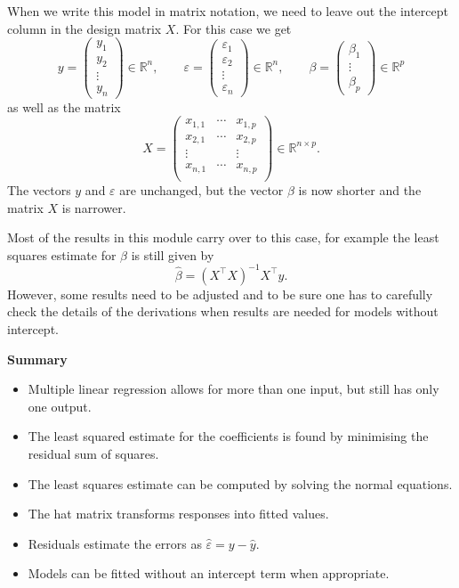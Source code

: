 \documentclass[
  a4paper,
]{article}
\providecommand{\tightlist}{%
  \setlength{\itemsep}{0pt}\setlength{\parskip}{0pt}}
\theoremstyle{definition}
\theoremstyle{definition}
\theoremstyle{definition}
\theoremstyle{definition}
\theoremstyle{remark}
\begin{document}
When we write this model in matrix notation, we need to leave out
the intercept column in the design matrix \(X\). For this case we get
\begin{equation*}
  y = \begin{pmatrix}
    y_1 \\ y_2 \\ \vdots \\ y_n
  \end{pmatrix}
  \in \mathbb{R}^n,
  \qquad
  \varepsilon= \begin{pmatrix}
    \varepsilon_1 \\ \varepsilon_2 \\ \vdots \\ \varepsilon_n
  \end{pmatrix}
  \in \mathbb{R}^n,
  \qquad
  \beta = \begin{pmatrix}
    \beta_1 \\
    \vdots \\
    \beta_p
  \end{pmatrix}
  \in\mathbb{R}^p
\end{equation*}
as well as the matrix
\begin{equation*}
  X = \begin{pmatrix}
    x_{1,1} & \cdots & x_{1,p} \\
    x_{2,1} & \cdots & x_{2,p} \\
    \vdots & & \vdots \\
    x_{n,1} & \cdots & x_{n,p} \\
  \end{pmatrix}
  \in \mathbb{R}^{n\times p}.
\end{equation*}
The vectors \(y\) and \(\varepsilon\) are unchanged, but the vector \(\beta\)
is now shorter and the matrix \(X\) is narrower.

Most of the results in this module carry over to this case, for example
the least squares estimate for \(\beta\) is still given by
\begin{equation*}
  \hat\beta
  = (X^\top X)^{-1} X^\top y.
\end{equation*}
However, some results need to be adjusted and to be sure one has to carefully
check the details of the derivations when results are needed for models without
intercept.

\textbf{Summary}

\begin{itemize}
\tightlist
\item
  Multiple linear regression allows for more than one input,
  but still has only one output.
\item
  The least squared estimate for the coefficients is found
  by minimising the residual sum of squares.
\item
  The least squares estimate can be computed by solving the normal equations.
\item
  The hat matrix transforms responses into fitted values.
\item
  Residuals estimate the errors as \(\hat\varepsilon= y - \hat y\).
\item
  Models can be fitted without an intercept term when appropriate.
\end{itemize}
\end{document}
